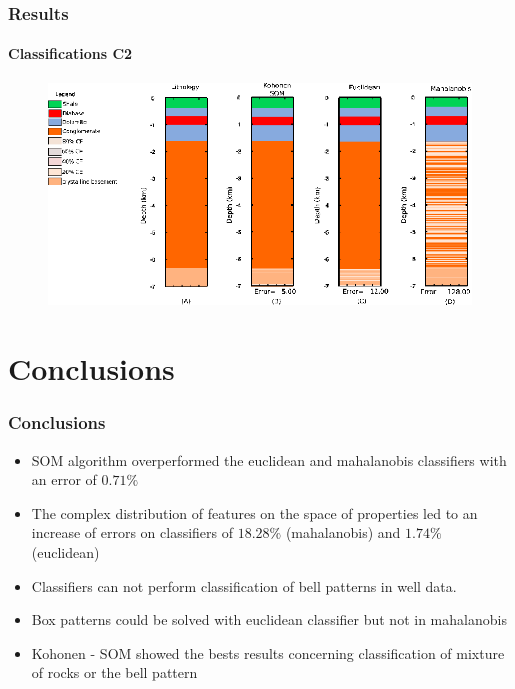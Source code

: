 \documentclass[aspectratio=10]{beamer} %
\begin{document}
\begin{frame}
\frametitle{Results}
\framesubtitle{Classifications C2}
	\begin{figure}[H]
		\centering
		\includegraphics[scale=0.35]{Imagens/IDC2020118.eps}
		\label{C2}
	\end{figure}
\end{frame}

\section{Conclusions}

\begin{frame}
	\frametitle{Conclusions}
	\begin{itemize}
		\item SOM algorithm overperformed the euclidean and mahalanobis classifiers with an error of $0.71\%$
		\pause
		\item The complex distribution of features on the space of properties led to an increase of errors on classifiers of $18.28\%$ (mahalanobis) and $1.74\%$ (euclidean)
		\pause
		\item Classifiers can not perform classification of bell patterns in well data. 
		\pause
		\item Box patterns could be solved with euclidean classifier but not in mahalanobis
		\pause
		\item Kohonen - SOM showed the bests results concerning classification of mixture of rocks or the bell pattern
	\end{itemize}
\end{frame}


\end{document}
